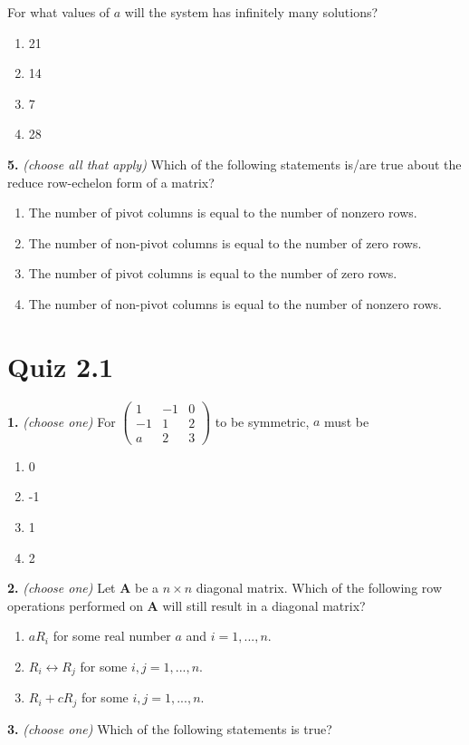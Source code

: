 \documentclass[10pt,a4paper]{article}
\begin{document}
For what values of \(a\) will the system has infinitely many solutions?

\begin{enumerate}[label=(\Alph*)]
\item 21
\item 14
\item 7
\item 28
\end{enumerate}
\smallskip
\textbf{5.} \textit{(choose all that apply)} Which of the following statements is/are true about the reduce row-echelon form of a matrix?

\begin{enumerate}[label=(\Alph*)]
\item The number of pivot columns is equal to the number of nonzero rows.
\item The number of non-pivot columns is equal to the number of zero rows.
\item The number of pivot columns is equal to the number of zero rows.
\item The number of non-pivot columns is equal to the number of nonzero rows.
\end{enumerate}
\smallskip
\section{Quiz 2.1}
\textbf{1.} \textit{(choose one)} For \(\begin{pmatrix}1&-1&0\\-1&1&2\\a&2&3\end{pmatrix}\) to be symmetric, \(a\) must be

\begin{enumerate}[label=(\Alph*)]
\item 0
\item -1
\item 1
\item 2
\end{enumerate}
\smallskip
\textbf{2.} \textit{(choose one)} Let \(\mathbf{A}\) be a \(n\times n\) diagonal matrix. Which of the following row operations performed on \(\mathbf{A}\) will still result in a diagonal matrix?

\begin{enumerate}[label=(\Alph*)]
\item \(aR_i\) for some real number \(a\) and \(i=1,...,n\).
\item \(R_i\leftrightarrow R_j\) for some \(i,j=1,...,n\).
\item \(R_i+cR_j\) for some \(i,j=1,...,n\).
\end{enumerate}
\smallskip
\textbf{3.} \textit{(choose one)} Which of the following statements is true?
\end{document}
